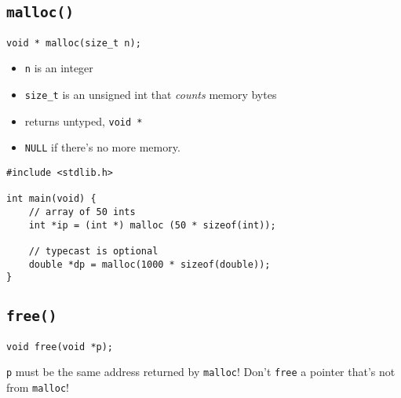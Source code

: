 \subsection{\texttt{malloc()}}
\begin{verbatim}
void * malloc(size_t n);
\end{verbatim}
\begin{itemize}
	\item \texttt{n} is an integer
	\item \texttt{size\_t} is an unsigned int that \emph{counts} memory bytes
	\item returns untyped, \texttt{void *}
	\item \texttt{NULL} if there's no more memory.
\end{itemize}

\begin{verbatim}
#include <stdlib.h>

int main(void) {
	// array of 50 ints
	int *ip = (int *) malloc (50 * sizeof(int));
	
	// typecast is optional
	double *dp = malloc(1000 * sizeof(double));
}
\end{verbatim}

\subsection{\texttt{free()}}
\begin{verbatim}
void free(void *p);
\end{verbatim}
\texttt{p} must be the same address returned by \texttt{malloc}! Don't \texttt{free} a pointer that's not from \texttt{malloc}!